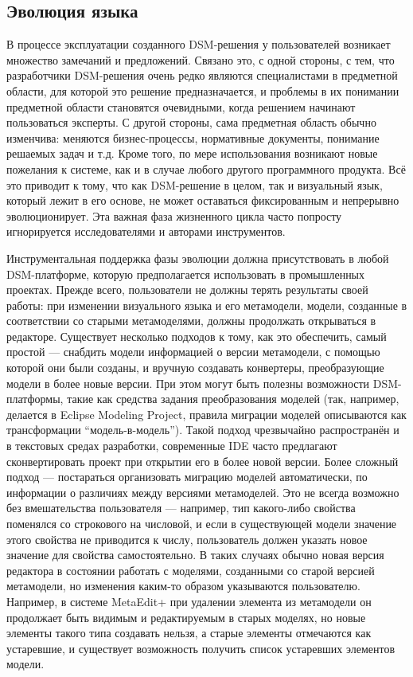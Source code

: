 \subsection{Эволюция языка}
В процессе эксплуатации созданного DSM-решения у пользователей возникает множество 
замечаний и предложений. Связано это, с одной стороны, с тем, что разработчики DSM-решения 
очень редко являются специалистами в предметной области, для которой это решение предназначается, 
и проблемы в их понимании предметной области становятся очевидными, когда решением 
начинают пользоваться эксперты. С другой стороны, сама предметная область обычно изменчива: 
меняются бизнес-процессы, нормативные документы, понимание решаемых задач и т.д. Кроме 
того, по мере использования возникают новые пожелания к системе, как и в случае любого 
другого программного продукта. Всё это приводит к тому, что как DSM-решение в целом, 
так и визуальный язык, который лежит в его основе, не может оставаться фиксированным 
и непрерывно эволюционирует. Эта важная фаза жизненного цикла часто попросту игнорируется 
исследователями и авторами инструментов.

Инструментальная поддержка фазы эволюции должна присутствовать в любой DSM-платформе, 
которую предполагается использовать в промышленных проектах. Прежде всего, пользователи 
не должны терять результаты своей работы: при изменении визуального языка и его метамодели, 
модели, созданные в соответствии со старыми метамоделями, должны продолжать открываться в редакторе. 
Существует несколько подходов к тому, как это обеспечить, самый простой --- снабдить 
модели информацией о версии метамодели, с помощью которой они были созданы, и вручную 
создавать конвертеры, преобразующие модели в более новые версии. При этом могут быть 
полезны возможности DSM-платформы, такие как средства задания преобразования моделей 
(так, например, делается в Eclipse Modeling Project, правила миграции моделей описываются 
как трансформации "`модель-в-модель"'). Такой подход чрезвычайно распространён и в 
текстовых средах разработки, современные IDE часто предлагают сконвертировать проект 
при открытии его в более новой версии. Более сложный подход --- постараться организовать 
миграцию моделей автоматически, по информации о различиях между версиями метамоделей. 
Это не всегда возможно без вмешательства пользователя --- например, тип какого-либо 
свойства поменялся со строкового на числовой, и если в существующей модели значение 
этого свойства не приводится к числу, пользователь должен указать новое значение для свойства 
самостоятельно. В таких случаях обычно новая версия редактора в состоянии работать 
с моделями, созданными со старой версией метамодели, но изменения каким-то образом 
указываются пользователю. Например, в системе MetaEdit+ при удалении элемента из метамодели 
он продолжает быть видимым и редактируемым в старых моделях, но новые элементы такого 
типа создавать нельзя, а старые элементы отмечаются как устаревшие, и существует возможность 
получить список устаревших элементов модели.

